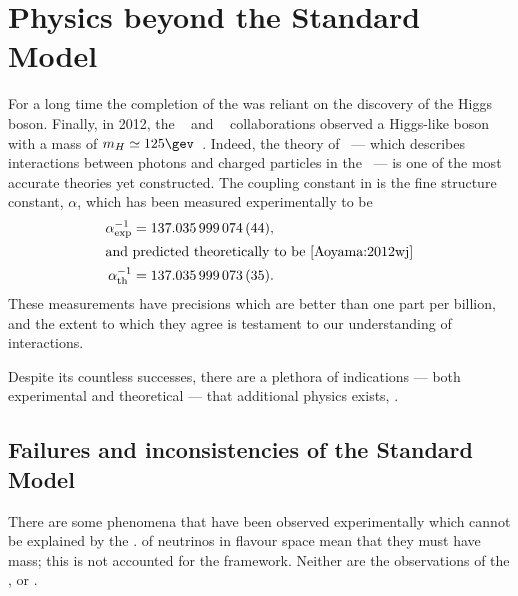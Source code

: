 \section{Physics beyond the Standard Model}
\label{sec:bsm}

For a long time the completion of the \sm was reliant on the discovery of the Higgs boson.
Finally, in 2012, the \cms~\cite{Chatrchyan:2008aa} and \atlas~\cite{Aad:2008zzm} collaborations
observed a Higgs-like boson with a mass of $m_H\simeq125\gev$~\cite{Chatrchyan:2012ufa,Aad:2012tfa}.
Indeed, the theory of \QED~--- which describes interactions between
photons and charged particles in the \sm~--- is one of the most accurate theories yet constructed.
The coupling constant in \QED is the fine structure constant, $\alpha$, which has been measured
experimentally to be~\cite{PDG2012}
\begin{align}
  \alpha^{-1}_\mathrm{exp} &= 137.035\,999\,074\,(44), \nonumber\\
  \intertext{and predicted theoretically to be~\cite{Aoyama:2012wj}}
  \alpha^{-1}_\mathrm{th} &= 137.035\,999\,073\,(35). \nonumber
\end{align}
These measurements have precisions which are better than one part per billion, and the extent to
which they agree is testament to our understanding of \QED interactions.

Despite its countless successes, there are a plethora of indications --- both
experimental and theoretical --- that additional physics exists, \bsm.


\subsection{Failures and inconsistencies of the Standard Model}
\label{sec:bsm:fail}
There are some phenomena that have been observed experimentally which cannot be explained by the
\sm.
 of neutrinos in flavour space mean that they must have
mass; this is not accounted for the \sm framework.
Neither are the observations of the \BAU, or \dm.

